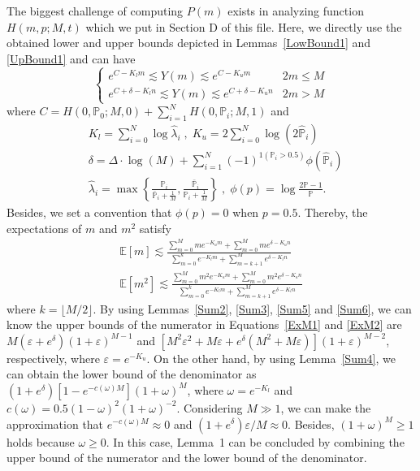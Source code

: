 \documentclass{article}
\begin{document}
The biggest challenge of computing $P(m)$ exists in analyzing function $H(m,p;M,t)$ which we put in Section D of this file. 
Here, we directly use the obtained lower and upper bounds  depicted in Lemmas~\ref{LowBound1} and \ref{UpBound1} and can have
\begin{equation}
\left\{
\begin{array}{lc}
e^{C-{K}_l m}\lesssim Y(m) \lesssim e^{C-K_u m} & 2m\leq M\\
e^{C+\delta-{K}_l  n}\lesssim Y(m) \lesssim e^{C+\delta-K_u n} & 2m>M
\end{array}
\right.
\end{equation}
where $C=H(0,\mathbb{P}_0;M,0)+\sum_{i=1}^{N}H(0,\mathbb{P}_i;M,1)$ and
\begin{equation*}
\begin{split}
&K_l = {\sum}_{i=0}^{N}\log \hat{\lambda}_{i}\;,\; K_u =  2{\sum}_{i=0}^{N}\log \left(2\hat{\mathbb{P}}_i\right)\\
&\delta = \Delta\cdot \log(M)+{\sum}_{i=1}^{N}(-1)^{1(\mathbb{P}_i>0.5)}\phi(\hat{\mathbb{P}}_i)\\
&\hat{\lambda}_i=\max\left\{\frac{\mathbb{P}_i}{\bar{\mathbb{P}}_i+\frac{1}{M}},\frac{\bar{\mathbb{P}}_i}{\mathbb{P}_i+\frac{1}{M}}\right\}
\;,\;\phi (p) =\log\frac{2\mathbb{P}-1}{\mathbb{P}}.
\end{split}
\end{equation*}
Besides, we set a convention that $\phi(p)=0$ when $p=0.5$. Thereby, the expectations of $m$ and $m^2$ satisfy
\begin{align}
\mathbb{E}[m] \lesssim \frac{\sum_{m=0}^{M}me^{-K_u m}+\sum_{m=0}^{M}me^{\delta-K_u n}}{\sum_{m=0}^{k}e^{-K_l m}+\sum_{m=k+1}^{M}e^{\delta-K_l n}}
\label{ExM1}\\
\mathbb{E}[m^2] \lesssim \frac{\sum_{m=0}^{M}m^2e^{-K_u m}+\sum_{m=0}^{M}m^2e^{\delta-K_u n}}{\sum_{m=0}^{k}e^{-K_l m}+\sum_{m=k+1}^{M}e^{\delta-K_l n}} \label{ExM2}
\end{align}
where $k=\lfloor M/2 \rfloor$.
By using Lemmas~\ref{Sum2}, \ref{Sum3}, \ref{Sum5} and \ref{Sum6}, we can know the upper bounds of the numerator in Equations~\ref{ExM1} and \ref{ExM2} are $M(\varepsilon+e^{\delta})(1+\varepsilon)^{M-1}$ and $[M^2\varepsilon^2+M\varepsilon+e^{\delta}(M^2+M\varepsilon)](1+\varepsilon)^{M-2}$, respectively, where $\varepsilon=e^{-K_u}$. On the other hand, by using Lemma~\ref{Sum4}, we can obtain the lower bound of the denominator as $(1+e^{\delta})[1-e^{-c(\omega)M}](1+\omega)^{M}$, where $\omega=e^{-K_l}$ and $c(\omega)=0.5(1-\omega)^2(1+\omega)^{-2}$.
Considering $M\gg 1$, we can make the approximation that $e^{-c(\omega)M}\approx 0$ and $(1+e^\delta)\varepsilon/M\approx 0$. Besides, $(1+\omega)^{M}\geq 1$ holds because $\omega\geq 0$. In this case, Lemma~1 can be concluded by combining the upper bound of the numerator and the lower bound of the denominator.
\end{document}
